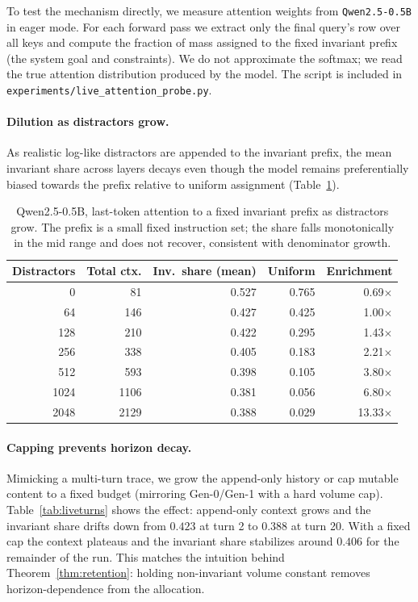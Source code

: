 ﻿\documentclass[11pt,a4paper]{article}
\theoremstyle{plain}
\theoremstyle{definition}
\theoremstyle{remark}
\begin{document}
To test the mechanism directly, we measure attention weights from
\texttt{Qwen2.5-0.5B} in eager mode. For each forward pass we extract only the
final query's row over all keys and compute the fraction of mass assigned to
the fixed invariant prefix (the system goal and constraints). We do not
approximate the softmax; we read the true attention distribution produced by the
model. The script is included in \texttt{experiments/live\_attention\_probe.py}.

\paragraph{Dilution as distractors grow.} As realistic log-like distractors are
appended to the invariant prefix, the mean invariant share across layers decays
even though the model remains preferentially biased towards the prefix relative
to uniform assignment (Table~\ref{tab:livesweep}).

\begin{table}[ht]
\centering
\small
\begin{tabular}{rrrrr}
\toprule
\textbf{Distractors} & \textbf{Total ctx.} & \textbf{Inv.\ share (mean)} & \textbf{Uniform} & \textbf{Enrichment} \\
\midrule
0    & 81   & 0.527 & 0.765 & 0.69$\times$ \\
64   & 146  & 0.427 & 0.425 & 1.00$\times$ \\
128  & 210  & 0.422 & 0.295 & 1.43$\times$ \\
256  & 338  & 0.405 & 0.183 & 2.21$\times$ \\
512  & 593  & 0.398 & 0.105 & 3.80$\times$ \\
1024 & 1106 & 0.381 & 0.056 & 6.80$\times$ \\
2048 & 2129 & 0.388 & 0.029 & 13.33$\times$ \\
\bottomrule
\end{tabular}
\caption{Qwen2.5-0.5B, last-token attention to a fixed invariant prefix as
distractors grow. The prefix is a small fixed instruction set; the share falls
monotonically in the mid range and does not recover, consistent with denominator
growth.}
\label{tab:livesweep}
\end{table}

\paragraph{Capping prevents horizon decay.} Mimicking a multi-turn trace, we
grow the append-only history or cap mutable content to a fixed budget (mirroring
Gen-0/Gen-1 with a hard volume cap). Table~\ref{tab:liveturns} shows the effect:
append-only context grows and the invariant share drifts down from $0.423$ at
turn 2 to $0.388$ at turn 20. With a fixed cap the context plateaus and the
invariant share stabilizes around $0.406$ for the remainder of the run. This
matches the intuition behind Theorem~\ref{thm:retention}: holding non-invariant
volume constant removes horizon-dependence from the allocation.
\end{document}
